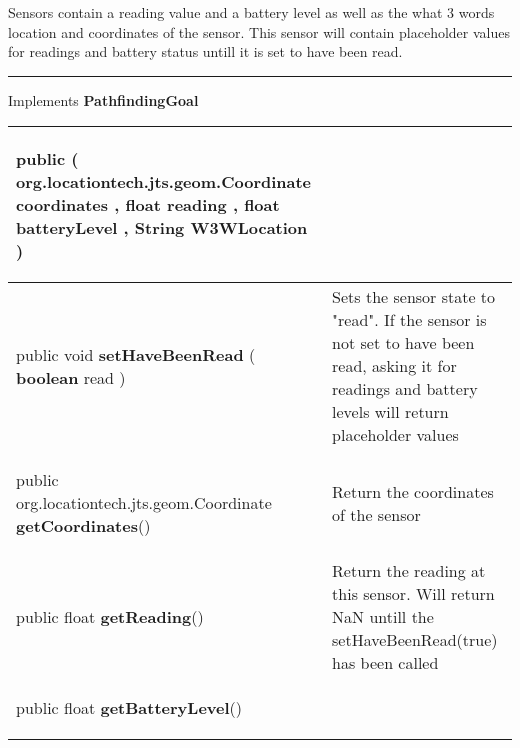  {\scriptsize Sensors contain a reading value and a battery level as well as the what 3 words location and coordinates of the sensor.\newline%
 This sensor will contain placeholder values for readings and battery status untill it is set to have been read.
 
\vspace*{4pt} \hrule \vspace*{3pt}
Implements \textbf{ PathfindingGoal }
\vspace*{-5pt} 
\begin{tabularx}{\linewidth}{X|m{}}
\label{tab:Sensor}
\begin{raggedleft}public  \textbf{\hyperref[tab:Sensor]{\color{blue}{Sensor}} }(\newline \hfill 
\hspace*{ 5pt} \textbf{org.locationtech.jts.geom.Coordinate} coordinates , \newline
 \hspace*{ 5pt} \textbf{float} reading , \newline
 \hspace*{ 5pt} \textbf{float} batteryLevel , \newline
 \hspace*{ 5pt} \textbf{String} W3WLocation  )
\end{raggedleft} &
 \\ \hline 
\begin{raggedleft}public void \textbf{setHaveBeenRead }(\hspace*{ 5pt} \textbf{boolean} read  )
\end{raggedleft} &
 Sets the sensor state to "read". If the sensor is not set to have been read, asking it for readings and battery levels will return placeholder values\\ \hline 
\begin{raggedleft}public org.locationtech.jts.geom.Coordinate \textbf{getCoordinates}()
\end{raggedleft} &
 Return the coordinates of the sensor\\ \hline 
\begin{raggedleft}public float \textbf{getReading}()
\end{raggedleft} &
 Return the reading at this sensor. Will return NaN untill the setHaveBeenRead(true) has been called\\ \hline 
\begin{raggedleft}public float \textbf{getBatteryLevel}()

\end{raggedleft}
\end{tabularx}}
